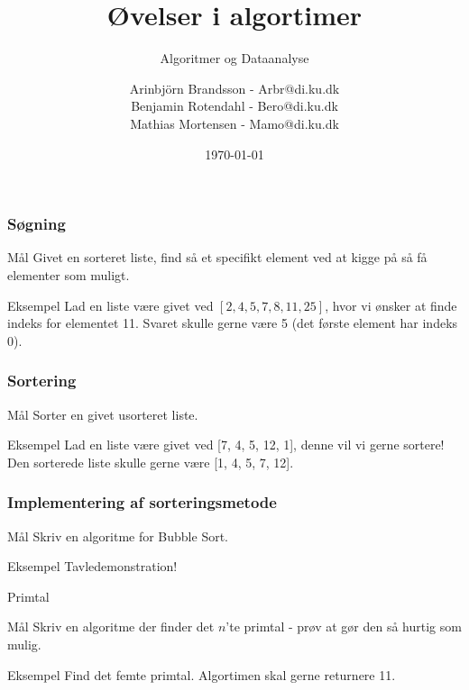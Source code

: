 \documentclass[12pt,t]{beamer}
\title{Øvelser i algortimer}
\subtitle{Algoritmer og Dataanalyse}
\author{
        Arinbjörn Brandsson - Arbr@di.ku.dk \\
        Benjamin Rotendahl - Bero@di.ku.dk\\
        Mathias Mortensen - Mamo@di.ku.dk
}
\date[]{\today}
\begin{document}
\frame[plain]{\titlepage}

\begin{frame}
  \frametitle{Søgning}
  \begin{block}{Mål}
  Givet en sorteret liste, find så et specifikt element ved at kigge på så få elementer som muligt.
  \end{block}
  \pause

  \begin{exampleblock}{Eksempel}
  Lad en liste være givet ved $[2, 4, 5, 7, 8, 11, 25]$, hvor vi ønsker at finde indeks for elementet 11. Svaret skulle gerne være 5 (det første element har indeks 0).
  \end{exampleblock}
\end{frame}

\begin{frame}
  \frametitle{Sortering}
  \begin{block}{Mål}
  Sorter en givet usorteret liste.
  \end{block}
  \pause

  \begin{exampleblock}{Eksempel}
  Lad en liste være givet ved [7, 4, 5, 12, 1], denne vil vi gerne sortere! Den sorterede liste skulle gerne være [1, 4, 5, 7, 12].
  \end{exampleblock}
\end{frame}

\begin{frame}
  \frametitle{Implementering af sorteringsmetode}
  \begin{block}{Mål}
  Skriv en algoritme for Bubble Sort.
  \end{block}
  \pause

  \begin{exampleblock}{Eksempel}
  Tavledemonstration!
  \end{exampleblock}
\end{frame}

\begin{frame}{Primtal}
  \begin{block}{Mål}
  Skriv en algoritme der finder det $n$'te primtal - prøv at gør den så hurtig som mulig.
  \end{block}
  \pause

  \begin{exampleblock}{Eksempel}
  Find det femte primtal. Algortimen skal gerne returnere 11.
  \end{exampleblock}
\end{frame}
\end{document}
